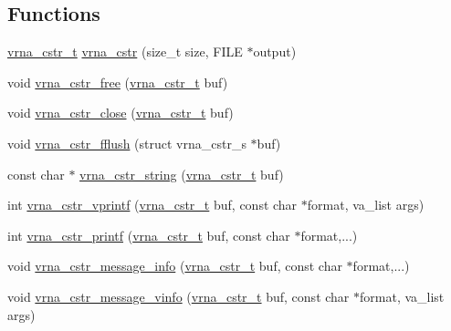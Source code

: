 \subsection*{Functions}
\begin{DoxyCompactItemize}
\item 
\mbox{\hyperlink{group__buffer__utils_ga445bbbcfca238a956bbc11862892adc8}{vrna\+\_\+cstr\+\_\+t}} \mbox{\hyperlink{group__buffer__utils_gadb2818f368e10a3b60a96bb3c80228d2}{vrna\+\_\+cstr}} (size\+\_\+t size, F\+I\+LE $\ast$output)
\item 
void \mbox{\hyperlink{group__buffer__utils_ga7ec48ec280f699928c70428cc245dc77}{vrna\+\_\+cstr\+\_\+free}} (\mbox{\hyperlink{group__buffer__utils_ga445bbbcfca238a956bbc11862892adc8}{vrna\+\_\+cstr\+\_\+t}} buf)
\item 
void \mbox{\hyperlink{group__buffer__utils_ga5a3f6a0a73b3d2d38fe011cdaed0ad28}{vrna\+\_\+cstr\+\_\+close}} (\mbox{\hyperlink{group__buffer__utils_ga445bbbcfca238a956bbc11862892adc8}{vrna\+\_\+cstr\+\_\+t}} buf)
\item 
void \mbox{\hyperlink{group__buffer__utils_gab59ad4781f7de960bdd1af5b1965c94b}{vrna\+\_\+cstr\+\_\+fflush}} (struct vrna\+\_\+cstr\+\_\+s $\ast$buf)
\item 
const char $\ast$ \mbox{\hyperlink{group__buffer__utils_ga05a1326d7fe8250cb81899f3f875531e}{vrna\+\_\+cstr\+\_\+string}} (\mbox{\hyperlink{group__buffer__utils_ga445bbbcfca238a956bbc11862892adc8}{vrna\+\_\+cstr\+\_\+t}} buf)
\item 
int \mbox{\hyperlink{group__buffer__utils_ga35fdc69cf004aa57784f1764a31b20a6}{vrna\+\_\+cstr\+\_\+vprintf}} (\mbox{\hyperlink{group__buffer__utils_ga445bbbcfca238a956bbc11862892adc8}{vrna\+\_\+cstr\+\_\+t}} buf, const char $\ast$format, va\+\_\+list args)
\item 
int \mbox{\hyperlink{group__buffer__utils_ga3c7eaa46b1e74c4641e4fa5927079462}{vrna\+\_\+cstr\+\_\+printf}} (\mbox{\hyperlink{group__buffer__utils_ga445bbbcfca238a956bbc11862892adc8}{vrna\+\_\+cstr\+\_\+t}} buf, const char $\ast$format,...)
\item 
void \mbox{\hyperlink{group__buffer__utils_gaa0da077cf03f29808229ab8c0e1e63eb}{vrna\+\_\+cstr\+\_\+message\+\_\+info}} (\mbox{\hyperlink{group__buffer__utils_ga445bbbcfca238a956bbc11862892adc8}{vrna\+\_\+cstr\+\_\+t}} buf, const char $\ast$format,...)
\item 
void \mbox{\hyperlink{group__buffer__utils_ga791a25424f0bc9769ec16a22794c7137}{vrna\+\_\+cstr\+\_\+message\+\_\+vinfo}} (\mbox{\hyperlink{group__buffer__utils_ga445bbbcfca238a956bbc11862892adc8}{vrna\+\_\+cstr\+\_\+t}} buf, const char $\ast$format, va\+\_\+list args)

\end{DoxyCompactItemize}
